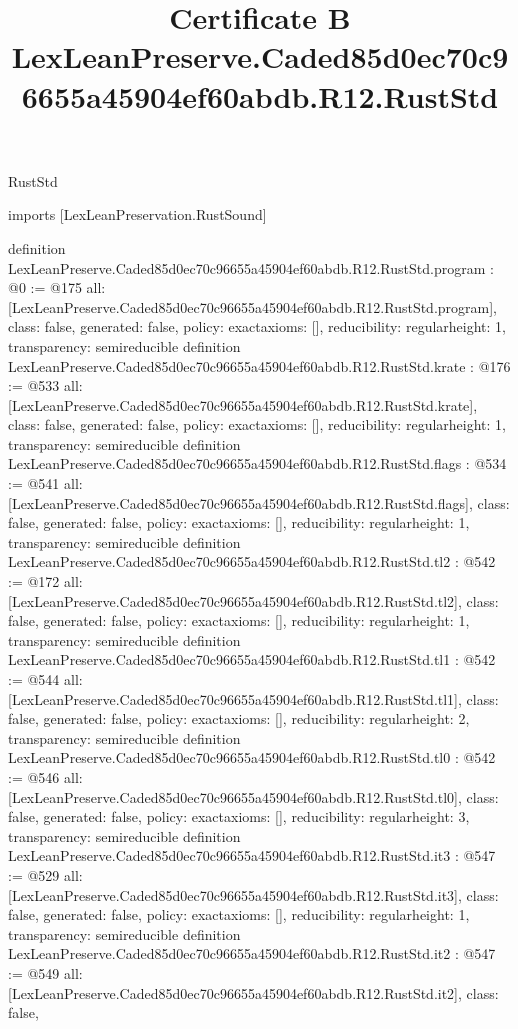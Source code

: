 \begin{lexlean}{RustStd}
\title{Certificate B LexLeanPreserve.Caded85d0ec70c96655a45904ef60abdb.R12.RustStd}
\begin{coremodule}
imports [LexLeanPreservation.RustSound]

definition LexLeanPreserve.Caded85d0ec70c96655a45904ef60abdb.R12.RustStd.program : @0 := @175 {
  all: [LexLeanPreserve.Caded85d0ec70c96655a45904ef60abdb.R12.RustStd.program],
  class: false,
  generated: false,
  policy: exact{axioms: []},
  reducibility: regular{height: 1},
  transparency: semireducible
}
definition LexLeanPreserve.Caded85d0ec70c96655a45904ef60abdb.R12.RustStd.krate : @176 := @533 {
  all: [LexLeanPreserve.Caded85d0ec70c96655a45904ef60abdb.R12.RustStd.krate],
  class: false,
  generated: false,
  policy: exact{axioms: []},
  reducibility: regular{height: 1},
  transparency: semireducible
}
definition LexLeanPreserve.Caded85d0ec70c96655a45904ef60abdb.R12.RustStd.flags : @534 := @541 {
  all: [LexLeanPreserve.Caded85d0ec70c96655a45904ef60abdb.R12.RustStd.flags],
  class: false,
  generated: false,
  policy: exact{axioms: []},
  reducibility: regular{height: 1},
  transparency: semireducible
}
definition LexLeanPreserve.Caded85d0ec70c96655a45904ef60abdb.R12.RustStd.tl2 : @542 := @172 {
  all: [LexLeanPreserve.Caded85d0ec70c96655a45904ef60abdb.R12.RustStd.tl2],
  class: false,
  generated: false,
  policy: exact{axioms: []},
  reducibility: regular{height: 1},
  transparency: semireducible
}
definition LexLeanPreserve.Caded85d0ec70c96655a45904ef60abdb.R12.RustStd.tl1 : @542 := @544 {
  all: [LexLeanPreserve.Caded85d0ec70c96655a45904ef60abdb.R12.RustStd.tl1],
  class: false,
  generated: false,
  policy: exact{axioms: []},
  reducibility: regular{height: 2},
  transparency: semireducible
}
definition LexLeanPreserve.Caded85d0ec70c96655a45904ef60abdb.R12.RustStd.tl0 : @542 := @546 {
  all: [LexLeanPreserve.Caded85d0ec70c96655a45904ef60abdb.R12.RustStd.tl0],
  class: false,
  generated: false,
  policy: exact{axioms: []},
  reducibility: regular{height: 3},
  transparency: semireducible
}
definition LexLeanPreserve.Caded85d0ec70c96655a45904ef60abdb.R12.RustStd.it3 : @547 := @529 {
  all: [LexLeanPreserve.Caded85d0ec70c96655a45904ef60abdb.R12.RustStd.it3],
  class: false,
  generated: false,
  policy: exact{axioms: []},
  reducibility: regular{height: 1},
  transparency: semireducible
}
definition LexLeanPreserve.Caded85d0ec70c96655a45904ef60abdb.R12.RustStd.it2 : @547 := @549 {
  all: [LexLeanPreserve.Caded85d0ec70c96655a45904ef60abdb.R12.RustStd.it2],
  class: false,
}
\end{coremodule}
\end{lexlean}
